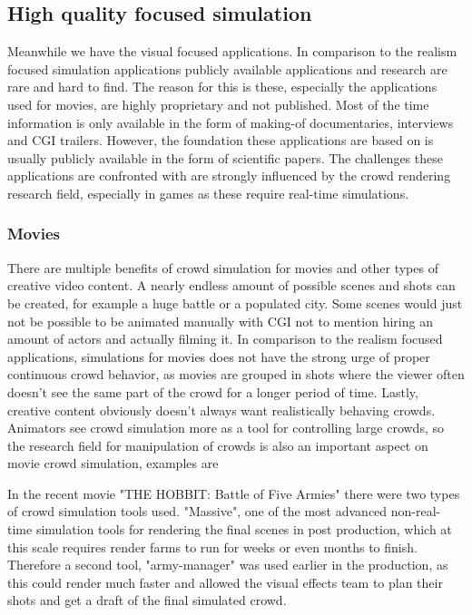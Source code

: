 \documentclass{acmsiggraph}               %
\begin{document}
\subsection{High quality focused simulation}

Meanwhile we have the visual focused applications. In comparison to the realism focused simulation applications publicly available applications and research are rare and hard to find. The reason for this is these, especially the applications used for movies, are highly proprietary and not published. Most of the time information is only available in the form of making-of documentaries, interviews and CGI trailers. 
However, the foundation these applications are based on is usually publicly available in the form of scientific papers. The challenges these applications are confronted with are strongly influenced by the crowd rendering research field, especially in games as these require real-time simulations. \cite{thalmann_crowd_2013}

\subsubsection{Movies}

There are multiple benefits of crowd simulation for movies and other types of creative video content. A nearly endless amount of possible scenes and shots can be created, for example a huge battle or a populated city. Some scenes would just not be possible to be animated manually with CGI not to mention hiring an amount of actors and actually filming it. In comparison to the realism focused applications, simulations for movies does not have the strong urge of proper continuous crowd behavior, as movies are grouped in shots where the viewer often doesn't see the same part of the crowd for a longer period of time. Lastly, creative content obviously doesn't always want realistically behaving crowds. Animators see crowd simulation more as a tool for controlling large crowds, so the research field for manipulation of crowds is also an important aspect on movie crowd simulation,  examples are \cite{kim_interactive_2014} \cite{ulicny_crowdbrush_2004}

In the recent movie "THE HOBBIT: Battle of Five Armies" there were  two types of crowd simulation tools used. "Massive", one of the most advanced non-real-time simulation tools \cite{massive_website} for rendering the final scenes in post production, which at this scale requires render farms to run for weeks or even months to finish. Therefore a second tool, "army-manager" was used earlier in the production, as this could render much faster and allowed the visual effects team to plan their shots and get a draft of the final simulated crowd. \cite{wired_hobbit_doku}
\end{document}
